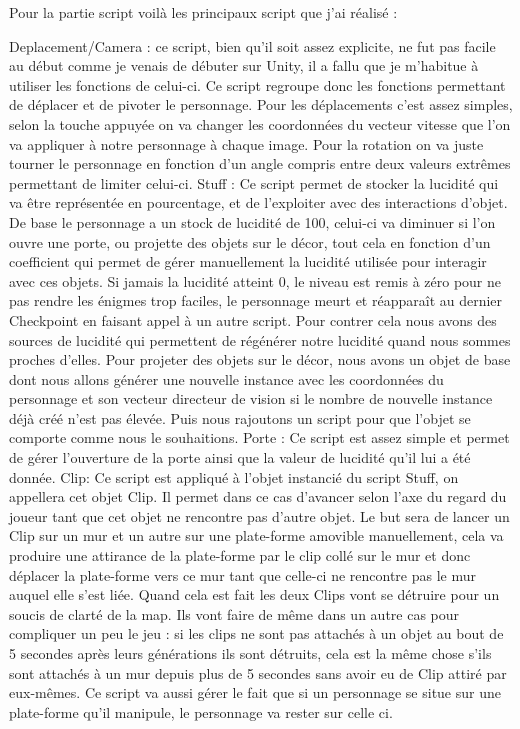 \documentclass[a4paper]{article}
\begin{document}
Pour la partie script voilà les principaux script que j’ai réalisé :

Deplacement/Camera : ce script, bien qu’il soit assez explicite, ne fut pas facile au début comme je venais de débuter sur Unity, il a fallu que je m’habitue à utiliser les fonctions de celui-ci. Ce script regroupe donc les fonctions permettant de déplacer et de pivoter le personnage. Pour les déplacements c’est assez simples, selon la touche appuyée on va changer les coordonnées du vecteur vitesse que l’on va appliquer à notre personnage à chaque image. Pour la rotation on va juste tourner le personnage en fonction d’un angle compris entre deux valeurs extrêmes permettant de limiter celui-ci.
Stuff : Ce script permet de stocker la lucidité qui va être représentée en pourcentage, et de l’exploiter avec des interactions d’objet. De base le personnage a un stock de lucidité de 100, celui-ci va diminuer si l’on ouvre une porte, ou projette des objets sur le décor, tout cela en fonction d’un coefficient qui permet de gérer manuellement la lucidité utilisée pour interagir avec ces objets. Si jamais la lucidité atteint 0, le niveau est remis à zéro pour ne pas rendre les énigmes trop faciles, le personnage meurt et réapparaît au dernier Checkpoint en faisant appel à un autre script. Pour contrer cela nous avons des sources de lucidité qui permettent de régénérer notre lucidité quand nous sommes proches d’elles. Pour projeter des objets sur le décor, nous avons un objet de base dont nous allons générer une nouvelle instance avec les coordonnées du personnage et son vecteur directeur de vision si le nombre de nouvelle instance déjà créé n’est pas élevée. Puis nous rajoutons un script pour que l’objet se comporte comme nous le souhaitions.
Porte : Ce script est assez simple et permet de gérer l’ouverture de la porte ainsi que la valeur de lucidité qu’il lui a été donnée.
Clip: Ce script est appliqué à l’objet instancié du script Stuff, on appellera cet objet Clip. Il permet dans ce cas d’avancer selon l’axe du regard du joueur tant que cet objet ne rencontre pas d’autre objet. Le but sera de lancer un Clip sur un mur et un autre sur une plate-forme amovible manuellement, cela va produire une attirance de la plate-forme par le clip collé sur le mur et donc déplacer la plate-forme vers ce mur tant que celle-ci ne rencontre pas le mur auquel elle s’est liée. Quand cela est fait les deux Clips vont se détruire pour un soucis de clarté de la map. Ils vont faire de même dans un autre cas pour compliquer un peu le jeu : si les clips ne sont pas attachés à un objet au bout de 5 secondes après leurs générations ils sont détruits, cela est la même chose s’ils sont attachés à un mur depuis plus de 5 secondes sans avoir eu de Clip attiré par eux-mêmes. Ce script va aussi gérer le fait que si un personnage se situe sur une plate-forme qu’il manipule, le personnage va rester sur celle ci.
\end{document}
